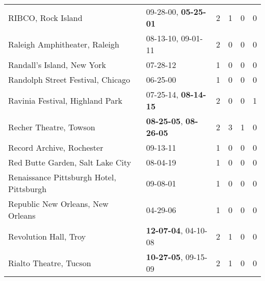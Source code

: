 \begin{longtable}{p{}p{}p{}p{}p{}p{}}
                                                           RIBCO, Rock Island &           09-28-00\textsuperscript{}, \textbf{05-25-01\textsuperscript{}} &  2 &  1 &  0 &  0 \\
                                                Raleigh Amphitheater, Raleigh &                    08-13-10\textsuperscript{}, 09-01-11\textsuperscript{} &  2 &  0 &  0 &  0 \\
                                                   Randall's Island, New York &                                                07-28-12\textsuperscript{} &  1 &  0 &  0 &  0 \\
                                            Randolph Street Festival, Chicago &                                                06-25-00\textsuperscript{} &  1 &  0 &  0 &  0 \\
                                              Ravinia Festival, Highland Park &           07-25-14\textsuperscript{}, \textbf{08-14-15\textsuperscript{}} &  2 &  0 &  0 &  1 \\
                                                       Recher Theatre, Towson &  \textbf{08-25-05\textsuperscript{}}, \textbf{08-26-05\textsuperscript{}} &  2 &  3 &  1 &  0 \\
                                                    Record Archive, Rochester &                                                09-13-11\textsuperscript{} &  1 &  0 &  0 &  0 \\
                                             Red Butte Garden, Salt Lake City &                                                08-04-19\textsuperscript{} &  1 &  0 &  0 &  0 \\
                                     Renaissance Pittsburgh Hotel, Pittsburgh &                                                09-08-01\textsuperscript{} &  1 &  0 &  0 &  0 \\
                                            Republic New Orleans, New Orleans &                                                04-29-06\textsuperscript{} &  1 &  0 &  0 &  0 \\
                                                        Revolution Hall, Troy &           \textbf{12-07-04\textsuperscript{}}, 04-10-08\textsuperscript{} &  2 &  1 &  0 &  0 \\
                                                       Rialto Theatre, Tucson &           \textbf{10-27-05\textsuperscript{}}, 09-15-09\textsuperscript{} &  2 &  1 &  0 &  0 \\

\end{longtable}
